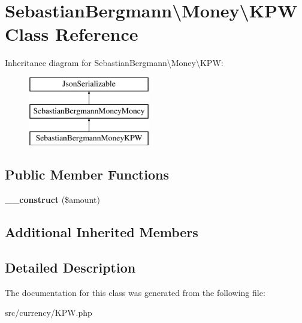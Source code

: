 \hypertarget{classSebastianBergmann_1_1Money_1_1KPW}{}\section{Sebastian\+Bergmann\textbackslash{}Money\textbackslash{}K\+P\+W Class Reference}
\label{classSebastianBergmann_1_1Money_1_1KPW}
Inheritance diagram for Sebastian\+Bergmann\textbackslash{}Money\textbackslash{}K\+P\+W\+:\begin{figure}[H]
\begin{center}
\leavevmode
\includegraphics[height=3.000000cm]{classSebastianBergmann_1_1Money_1_1KPW}
\end{center}
\end{figure}
\subsection*{Public Member Functions}
\begin{DoxyCompactItemize}
\item 
\hypertarget{classSebastianBergmann_1_1Money_1_1KPW_a0df4718fe2c0e896b2ccd8b051946701}{}{\bfseries \+\_\+\+\_\+construct} (\$amount)\label{classSebastianBergmann_1_1Money_1_1KPW_a0df4718fe2c0e896b2ccd8b051946701}

\end{DoxyCompactItemize}
\subsection*{Additional Inherited Members}


\subsection{Detailed Description}


The documentation for this class was generated from the following file\+:\begin{DoxyCompactItemize}
\item 
src/currency/K\+P\+W.\+php\end{DoxyCompactItemize}
